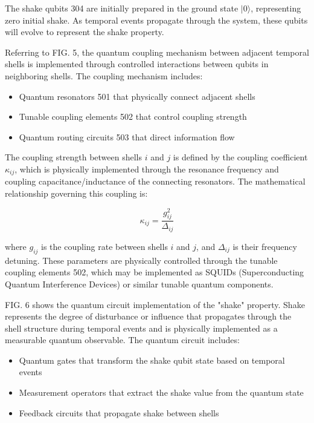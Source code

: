 \documentclass[12pt,letterpaper]{article}
\begin{document}
The shake qubits 304 are initially prepared in the ground state $|0\rangle$, representing zero initial shake. As temporal events propagate through the system, these qubits will evolve to represent the shake property.

Referring to FIG. 5, the quantum coupling mechanism between adjacent temporal shells is implemented through controlled interactions between qubits in neighboring shells. The coupling mechanism includes:

\begin{itemize}
    \item Quantum resonators 501 that physically connect adjacent shells
    \item Tunable coupling elements 502 that control coupling strength
    \item Quantum routing circuits 503 that direct information flow
\end{itemize}

The coupling strength between shells $i$ and $j$ is defined by the coupling coefficient $\kappa_{ij}$, which is physically implemented through the resonance frequency and coupling capacitance/inductance of the connecting resonators. The mathematical relationship governing this coupling is:

$$\kappa_{ij} = \frac{g_{ij}^2}{\Delta_{ij}}$$

where $g_{ij}$ is the coupling rate between shells $i$ and $j$, and $\Delta_{ij}$ is their frequency detuning. These parameters are physically controlled through the tunable coupling elements 502, which may be implemented as SQUIDs (Superconducting Quantum Interference Devices) or similar tunable quantum components.

FIG. 6 shows the quantum circuit implementation of the "shake" property. Shake represents the degree of disturbance or influence that propagates through the shell structure during temporal events and is physically implemented as a measurable quantum observable. The quantum circuit includes:

\begin{itemize}
    \item Quantum gates that transform the shake qubit state based on temporal events
    \item Measurement operators that extract the shake value from the quantum state
    \item Feedback circuits that propagate shake between shells
\end{itemize}
\end{document}
